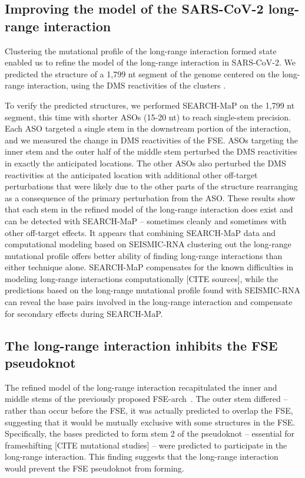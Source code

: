 \documentclass[main.tex]{subfiles}
\begin{document}
\subsection{Improving the model of the SARS-CoV-2 long-range interaction}

Clustering the mutational profile of the long-range interaction formed state enabled us to refine the model of the long-range interaction in SARS-CoV-2.
We predicted the structure of a 1,799 nt segment of the genome centered on the long-range interaction, using the DMS reactivities of the clusters .

To verify the predicted structures, we performed SEARCH-MaP on the 1,799 nt segment, this time with shorter ASOs (15-20 nt) to reach single-stem precision.
Each ASO targeted a single stem in the downstream portion of the interaction, and we measured the change in DMS reactivities of the FSE.
ASOs targeting the inner stem and the outer half of the middle stem perturbed the DMS reactivities in exactly the anticipated locations.
The other ASOs also perturbed the DMS reactivities at the anticipated location with additional other off-target perturbations that were likely due to the other parts of the structure rearranging as a consequence of the primary perturbation from the ASO.
These results show that each stem in the refined model of the long-range interaction does exist and can be detected with SEARCH-MaP -- sometimes cleanly and sometimes with other off-target effects.
It appears that combining SEARCH-MaP data and computational modeling based on SEISMIC-RNA clustering out the long-range mutational profile offers better ability of finding long-range interactions than either technique alone.
SEARCH-MaP compensates for the known difficulties in modeling long-range interactions computationally [CITE sources], while the predictions based on the long-range mutational profile found with SEISMIC-RNA can reveal the base pairs involved in the long-range interaction and compensate for secondary effects during SEARCH-MaP.

\subsection{The long-range interaction inhibits the FSE pseudoknot}

The refined model of the long-range interaction recapitulated the inner and middle stems of the previously proposed FSE-arch~\cite{Ziv2020}.
The outer stem differed -- rather than occur before the FSE, it was actually predicted to overlap the FSE, suggesting that it would be mutually exclusive with some structures in the FSE.
Specifically, the bases predicted to form stem 2 of the pseudoknot -- essential for frameshifting [CITE mutational studies] -- were predicted to participate in the long-range interaction.
This finding suggests that the long-range interaction would prevent the FSE pseudoknot from forming.
\end{document}
